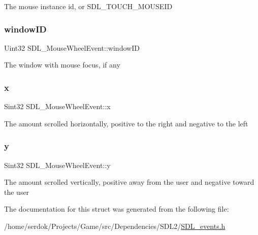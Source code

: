 The mouse instance id, or S\+D\+L\+\_\+\+T\+O\+U\+C\+H\+\_\+\+M\+O\+U\+S\+E\+ID \mbox{\label{structSDL__MouseWheelEvent_ab45eb1895217214ecb773fc555e08f6c}} 
\subsubsection{\texorpdfstring{window\+ID}{windowID}}
{\footnotesize\ttfamily Uint32 S\+D\+L\+\_\+\+Mouse\+Wheel\+Event\+::window\+ID}

The window with mouse focus, if any \mbox{\label{structSDL__MouseWheelEvent_a6d904eef474ea45a5b1828fcb5b0f859}} 
\subsubsection{\texorpdfstring{x}{x}}
{\footnotesize\ttfamily Sint32 S\+D\+L\+\_\+\+Mouse\+Wheel\+Event\+::x}

The amount scrolled horizontally, positive to the right and negative to the left \mbox{\label{structSDL__MouseWheelEvent_a53fdf77a464426bc8b30e629795f044b}} 
\subsubsection{\texorpdfstring{y}{y}}
{\footnotesize\ttfamily Sint32 S\+D\+L\+\_\+\+Mouse\+Wheel\+Event\+::y}

The amount scrolled vertically, positive away from the user and negative toward the user 

The documentation for this struct was generated from the following file\+:\begin{DoxyCompactItemize}
\item 
/home/serdok/\+Projects/\+Game/src/\+Dependencies/\+S\+D\+L2/\hyperlink{SDL__events_8h}{S\+D\+L\+\_\+events.\+h}\end{DoxyCompactItemize}
